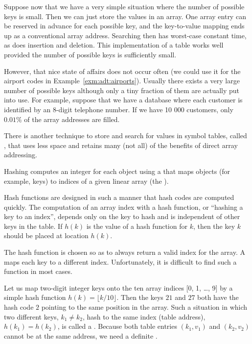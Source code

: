 Suppose now that we have a very simple situation where the number of 
possible keys is small. Then  we can just store the values in an array. 
One array entry can be reserved in advance for each possible key, and the 
key-to-value mapping ends up as a conventional array address. Searching then 
has worst-case constant time, as does insertion and deletion. This 
implementation of a table works well provided the number of possible keys is 
sufficiently small.

However, that nice state of affairs does not occur often (we could use it 
for the airport codes in  Example~\ref{exm:adt:airports}). Usually there exists 
a very large number of possible keys although only a tiny fraction of them are
actually put into use. For example, suppose that we have a database where each 
customer is identified by an 8-digit telephone number. If we have 10 000 customers, 
only $0.01\%$ of the array addresses are filled.

There is another technique to store and search for
values in symbol tables, called {}, that uses less space and 
retains many (not all) of the benefits of direct array addressing. 

\begin{Definition}
Hashing computes an integer  for each object using a 
 that maps objects (for example, keys) to indices of 
a given linear array (the ). 
\end{Definition}

Hash functions are designed in such a manner that hash codes are
computed quickly. The computation  of an array index with 
a hash function, or ``hashing a key to an index'',
depends only on the key to hash and is independent of other keys in the table.
 If \(h(k)\) is the value of a hash function for $k$, then the
 key \(k\) should be placed at location \(h(k)\).

The hash function is chosen so as to always return a valid index 
for the array. A  maps each key to a different 
index. Unfortunately, it is difficult to find such a function in most cases. 

\begin{Example} \label{exm:hashing}
Let us map two-digit integer keys onto the ten array indices 
[0, 1, \ldots, 9] by a
simple hash function \(h(k) = \lfloor k/10 \rfloor\). Then the keys \(21\) and
\(27\) both have the hash code \(2\) pointing to
the same position in the array. Such a situation in which two different keys, 
\(k_{1} \ne k_{2}\), hash to the same index (table address), 
\(h(k_{1}) = h(k_{2})\), is called a . Because both
table entries \((k_{1},v_{1})\) and \((k_{2},v_{2})\) cannot
be at the same address, we need a  definite {}. 
\end{Example}

